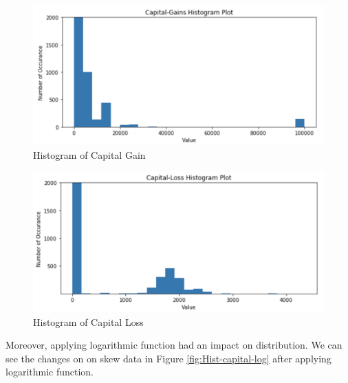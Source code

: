 \documentclass[sigconf]{acmart}
\begin{document}
 \begin{figure}[!ht]
  \centering
      \includegraphics[width=\columnwidth]{project/images/capital-gain.png}
  \caption{Histogram of Capital Gain \cite{Borga2017}}\label{fig:Hist-capital}
\end{figure}

 \begin{figure}[!ht]
  \centering
      \includegraphics[width=\columnwidth]{project/images/capital-loss.png}
  \caption{Histogram of Capital Loss \cite{Borga2017}}\label{fig:loss-capital}
\end{figure}

\par Moreover, applying logarithmic function had an impact on distribution. We can see the changes on on skew data in Figure \ref{fig:Hist-capital-log} after applying logarithmic function. 
\end{document}
